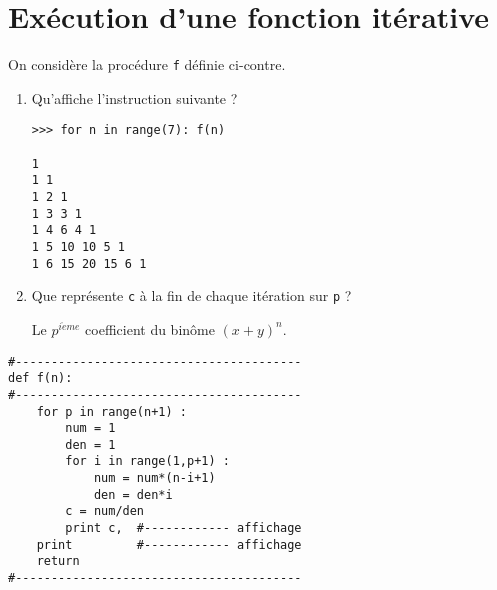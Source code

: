 \documentclass[12pt]{article}
\newenvironment{py}[1]{\begin{minipage}[t]{#1}\footnotesize}{\end{minipage}}
\begin{document}
\section{Exécution d'une fonction itérative}
\begin{minipage}[t]{7cm}
On considère la procédure {\tt f} définie ci-contre.
\begin{enumerate}
\item Qu'affiche l'instruction sui\-vante ?
\begin{verbatim}
>>> for n in range(7): f(n)

1
1 1
1 2 1
1 3 3 1
1 4 6 4 1
1 5 10 10 5 1
1 6 15 20 15 6 1
\end{verbatim}
\item Que représente {\tt c} à la fin de chaque itération sur {\tt p} ?

	Le $p^{i\grave eme}$ coefficient du binôme $(x+y)^n$.
\end{enumerate}
\end{minipage}
\hfill
\begin{py}{8cm}
\begin{verbatim}
#----------------------------------------
def f(n):
#----------------------------------------
    for p in range(n+1) :
        num = 1
        den = 1
        for i in range(1,p+1) :
            num = num*(n-i+1)
            den = den*i
        c = num/den
        print c,  #------------ affichage
    print         #------------ affichage
    return
#----------------------------------------
\end{verbatim}
\end{py}

\label{fini}
\end{document}
